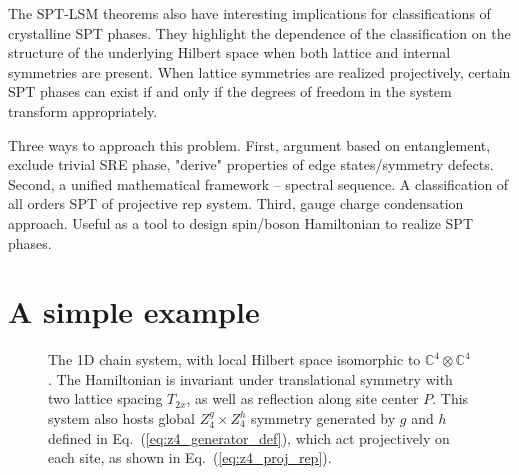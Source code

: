 \documentclass[reprint,amsmath,amssymb,aps,pra,]{revtex4-1}
\begin{document}
The SPT-LSM theorems also have interesting implications for classifications of crystalline SPT phases. They highlight the dependence of the classification on the structure of the underlying Hilbert space when both lattice and internal symmetries are present. When lattice symmetries are realized projectively, certain SPT phases can exist if and only if the degrees of freedom in the system transform appropriately. 




Three ways to approach this problem.
First, argument based on entanglement, exclude trivial SRE phase, "derive" properties of edge states/symmetry defects.
Second, a unified mathematical framework -- spectral sequence. A classification of all orders SPT of projective rep system.
Third, gauge charge condensation approach. Useful as a tool to design spin/boson Hamiltonian to realize SPT phases.


\section{A simple example}

\begin{figure}[h]
  \centering
  \caption{The 1D chain system, with local Hilbert space isomorphic to $\mathbb{C}^4\otimes\mathbb{C}^4$. The Hamiltonian is invariant under translational symmetry with two lattice spacing $T_{2x}$, as well as reflection along site center $P$. This system also hosts global $Z_4^g\times Z_4^h$ symmetry generated by $g$ and $h$ defined in Eq.~(\ref{eq:z4_generator_def}), which act projectively on each site, as shown in Eq.~(\ref{eq:z4_proj_rep}).}
  \label{fig:1d_z4z4_spt}
\end{figure}
\end{document}
